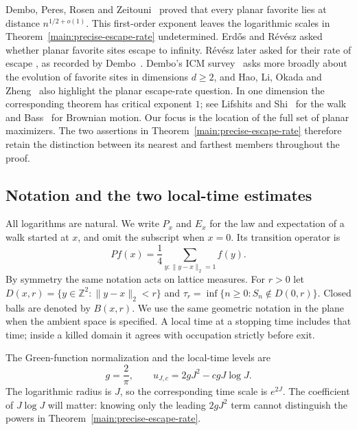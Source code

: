 Dembo, Peres, Rosen and Zeitouni~\cite[Theorem~1.1]{DPRZ2001} proved that
every planar favorite lies at distance $n^{1/2+o(1)}$. This first-order
exponent leaves the logarithmic scales in Theorem~\ref{main:precise-escape-rate}
undetermined. Erd\H{o}s and R\'ev\'esz
\cite[Question~14]{ErdosRevesz1987} asked whether planar favorite sites
escape to infinity. R\'ev\'esz later asked for their rate of escape
\cite[Chap.~19]{Revesz1990}, as recorded by Dembo~\cite[p.~6]{Dembo2005}.
Dembo's ICM survey~\cite[Open Problem~2.1]{Dembo2006} asks more broadly
about the evolution of favorite sites in dimensions $d\ge2$, and Hao,
Li, Okada and Zheng~\cite[Remark~1.4(1)]{HLOZ2025} also highlight the
planar escape-rate question. In one dimension the corresponding theorem
has critical exponent $1$; see Lifshits and Shi~\cite[Theorem~1.1]{LifshitsShi2004}
for the walk and Bass~\cite[Theorem~2.2]{Bass2023} for Brownian motion.
Our focus is the location of the full set of planar maximizers.
The two assertions in Theorem~\ref{main:precise-escape-rate} therefore retain
the distinction between its nearest and farthest members throughout the proof.

\subsection{Notation and the two local-time estimates}

All logarithms are natural. We write $P_x$ and $E_x$ for the law and
expectation of a walk started at $x$, and omit the subscript when $x=0$.
Its transition operator is
\[
 Pf(x)=\frac14\sum_{y:\|y-x\|_2=1}f(y).
\]
By symmetry the same notation acts on lattice measures. For $r>0$ let
$D(x,r)=\{y\in\mathbb Z^2:\|y-x\|_2<r\}$ and
$\tau_r=\inf\{n\ge0:S_n\notin D(0,r)\}$. Closed balls are denoted by
$B(x,r)$. We use the same geometric notation in the plane when the ambient
space is specified. A local time at a stopping time includes that time;
inside a killed domain it agrees with occupation strictly before exit.

The Green-function normalization and the local-time levels are
\begin{equation}\label{eq:level-definition}
 g=\frac2\pi,\qquad
 u_{J,c}=2gJ^2-cgJ\log J.
\end{equation}
The logarithmic radius is $J$, so the corresponding time scale is $e^{2J}$.
The coefficient of $J\log J$ will matter: knowing only the leading
$2gJ^2$ term cannot distinguish the powers in
Theorem~\ref{main:precise-escape-rate}.

